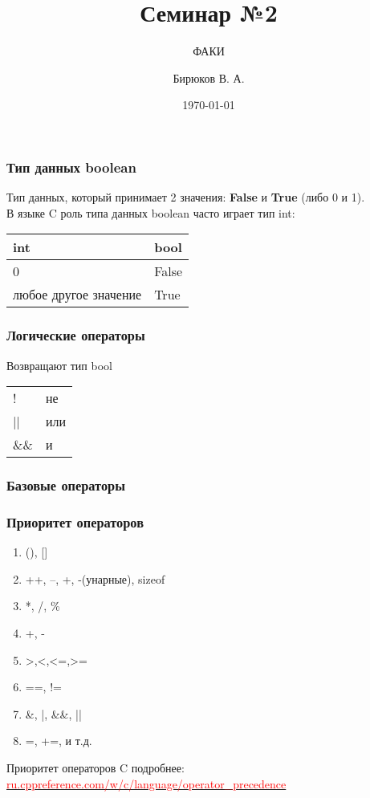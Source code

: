 \documentclass[12pt,pdf,hyperref={unicode}]{beamer}
\title{Семинар №2}
\subtitle{ФАКИ \the\year}
\author{Бирюков В. А.}
\date{\today}
\begin{document}
\lstset{language=C}

\begin{frame}
\titlepage
\end{frame} 




\begin{frame}
\frametitle{Тип данных boolean}
Тип данных, который принимает 2 значения: \textbf{False} и \textbf{True} (либо 0 и 1). \\
В языке C роль типа данных boolean часто играет тип int: \\
\begin{center}
\begin{tabular}{ l | l}
  int & bool \\\hline
  0 & False \\
  любое другое значение & True \\
\end{tabular}
\end{center}

\end{frame}


\begin{frame}
\frametitle{Логические операторы}
Возвращают тип bool
\begin{center}
\begin{tabular}{ l | l}
  ! & не \\
  || & или \\
  \&\& & и \\
\end{tabular}
\end{center}
\end{frame}


\begin{frame}
\frametitle{Базовые операторы}
\frametitle{Приоритет операторов}
\begin{center}
\begin{enumerate}
\item (), []
\item ++, --, +, -(унарные), sizeof
\item *, /, \%
\item +, -
\item >,<,<=,>=
\item ==, !=
\item \&, |, \&\&, ||
\item =, +=, и т.д.
\end{enumerate}
\end{center}
Приоритет операторов C подробнее:\\
\href{http://ru.cppreference.com/w/c/language/operator_precedence}
{\textcolor{red}{ru.cppreference.com/w/c/language/operator\_precedence}}
\end{frame}
\end{document}
